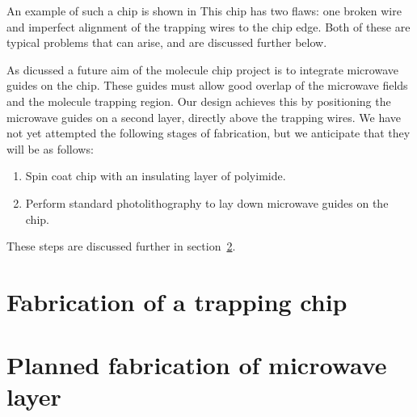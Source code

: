 An example of such a chip is shown in  This chip has two flaws: one broken wire
 and imperfect alignment of the trapping wires
to the chip edge. Both of these are typical problems that can arise, and are
discussed further below.

As dicussed  a future aim of the molecule chip project is to
integrate microwave guides on the chip. These guides must allow good overlap of
the microwave fields and the molecule trapping region. Our design achieves this
by positioning the microwave guides on a second layer, directly above the
trapping wires.  We have not yet attempted the following stages of
fabrication, but we anticipate that they will be as follows:
\begin{enumerate}[resume]
    \item Spin coat chip with an insulating layer of polyimide.
    \item Perform standard photolithography to lay down microwave guides on the
      chip.
\end{enumerate}
These steps are discussed further in section~\ref{fab:planned}.

\section{Fabrication of a trapping chip}


\section{Planned fabrication of microwave layer}
\label{fab:planned}

